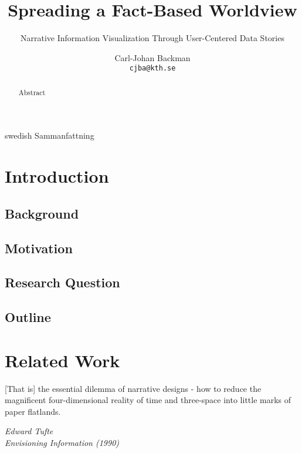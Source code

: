 \documentclass[a4paper,11pt,oldfontcommands]{packages/kth-mag}
\title{Spreading a Fact-Based Worldview}
\subtitle{Narrative Information Visualization Through User-Centered Data Stories}
\author{Carl-Johan Backman \\ \small{\texttt{\lowercase{cjba@kth.se}}}}
\date{}
\begin{document}
\frontmatter
\pagestyle{empty}
\removepagenumbers
\maketitle
{}

\begin{abstract}
Abstract
\end{abstract}
\clearpage

\begin{foreignabstract}{swedish}
Sammanfattning
\end{foreignabstract}
\clearpage

\tableofcontents*

\mainmatter
\pagestyle{newchap}

\chapter{Introduction}
\section{Background}
\section{Motivation}
\section{Research Question}
\section{Outline}

\chapter{Related Work}

\epigraph{[That is] the essential dilemma of narrative designs - how to reduce the magnificent four-dimensional reality of time and three-space into little marks of paper flatlands.}{\textit{Edward Tufte \cite{tufte1990envinf}\\ Envisioning Information (1990)}}
\end{document}

